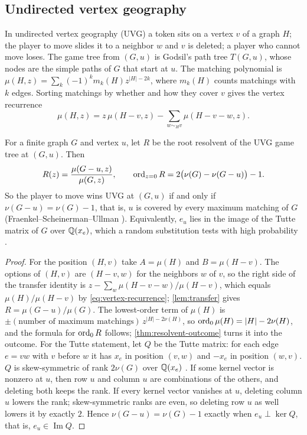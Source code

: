 \subsection{Undirected vertex geography}\label{ssec:uvg}
In undirected vertex geography (UVG) a token sits on a vertex $v$ of a graph $H$; the player to move slides it to a neighbor $w$ and $v$ is deleted; a player who cannot move loses. The game tree from $(G,u)$ is Godsil's path tree $T(G,u)$, whose nodes are the simple paths of $G$ that start at $u$. The matching polynomial is $\mu(H,z)=\sum_k(-1)^km_k(H)z^{|H|-2k}$, where $m_k(H)$ counts matchings with $k$ edges. Sorting matchings by whether and how they cover $v$ gives the vertex recurrence
\begin{equation}\label{eq:vertex-recurrence}
\mu(H,z)=z\,\mu(H-v,z)-\sum_{w\sim_Hv}\mu(H-v-w,z).
\end{equation}

\begin{theorem}\label{thm:matching-collapse}
For a finite graph $G$ and vertex $u$, let $R$ be the root resolvent of the UVG game tree at $(G,u)$. Then
\[
R(z)=\frac{\mu(G-u,z)}{\mu(G,z)},\qquad \operatorname{ord}_{z=0}R=2\bigl(\nu(G)-\nu(G-u)\bigr)-1.
\]
So the player to move wins UVG at $(G,u)$ if and only if $\nu(G-u)=\nu(G)-1$, that is, $u$ is covered by every maximum matching of $G$ \textup{(}Fraenkel--Scheinerman--Ullman \cite{FSU}\textup{)}. Equivalently, $e_u$ lies in the image of the Tutte matrix of $G$ over $\mathbb{Q}(x_e)$, which a random substitution tests with high probability \cite{Lovasz}.
\end{theorem}

\begin{proof}
For the position $(H,v)$ take $A=\mu(H)$ and $B=\mu(H-v)$. The options of $(H,v)$ are $(H-v,w)$ for the neighbors $w$ of $v$, so the right side of the transfer identity is $z-\sum_w\mu(H-v-w)/\mu(H-v)$, which equals $\mu(H)/\mu(H-v)$ by \eqref{eq:vertex-recurrence}; \cref{lem:transfer} gives $R=\mu(G-u)/\mu(G)$. The lowest-order term of $\mu(H)$ is $\pm(\text{number of maximum matchings})\,z^{|H|-2\nu(H)}$, so $\operatorname{ord}_0\mu(H)=|H|-2\nu(H)$, and the formula for $\operatorname{ord}_0R$ follows; \cref{thm:resolvent-outcome} turns it into the outcome.
For the Tutte statement, let $Q$ be the Tutte matrix: for each edge $e=vw$ with $v$ before $w$ it has $x_e$ in position $(v,w)$ and $-x_e$ in position $(w,v)$. $Q$ is skew-symmetric of rank $2\nu(G)$ over $\mathbb{Q}(x_e)$ \cite{Tutte,Lovasz}. If some kernel vector is nonzero at $u$, then row $u$ and column $u$ are combinations of the others, and deleting both keeps the rank. If every kernel vector vanishes at $u$, deleting column $u$ lowers the rank; skew-symmetric ranks are even, so deleting row $u$ as well lowers it by exactly $2$. Hence $\nu(G-u)=\nu(G)-1$ exactly when $e_u\perp\ker Q$, that is, $e_u\in\operatorname{Im}Q$.
\end{proof}

